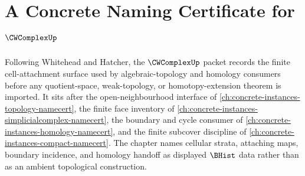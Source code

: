 \chapter{A Concrete Naming Certificate for $\CWComplexUp$}
\label{ch:concrete-instances-cw-complex-namecert}

Following Whitehead and Hatcher, the $\CWComplexUp$ packet records the finite cell-attachment surface used by algebraic-topology and homology consumers before any quotient-space, weak-topology, or homotopy-extension theorem is imported. It sits after the open-neighbourhood interface of \autoref{ch:concrete-instances-topology-namecert}, the finite face inventory of \autoref{ch:concrete-instances-simplicialcomplex-namecert}, the boundary and cycle consumer of \autoref{ch:concrete-instances-homology-namecert}, and the finite subcover discipline of \autoref{ch:concrete-instances-compact-namecert}. The chapter names cellular strata, attaching maps, boundary incidence, and homology handoff as displayed $\BHist$ data rather than as an ambient topological construction.

